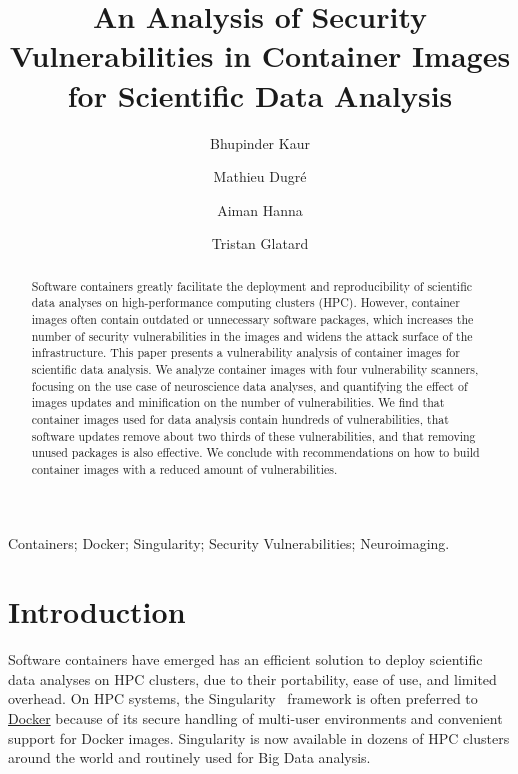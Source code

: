 \documentclass[a4paper,num-refs]{oup-contemporary}
\title{An Analysis of Security Vulnerabilities in Container Images for Scientific Data Analysis}
\begin{document}
\author{Bhupinder Kaur}
\author{Mathieu Dugr\'e}
\author{Aiman Hanna}
\author{Tristan Glatard}


\maketitle

\begin{abstract}
Software containers greatly facilitate the deployment and reproducibility
of scientific data analyses on high-performance computing clusters
(HPC). However, container images often contain outdated or unnecessary
software packages, which increases the number of security vulnerabilities
in the images and widens the attack surface of the infrastructure. This
paper presents a vulnerability analysis of container images for scientific
data analysis. We analyze container images with four vulnerability
scanners, focusing on the use case of neuroscience data analyses, and
quantifying the effect of images updates and minification on the number of
vulnerabilities. We find that container images used for data analysis
contain hundreds of vulnerabilities, that software updates remove about two
thirds of these vulnerabilities, and that removing unused packages is also
effective. We conclude with recommendations on how to build container
images with a reduced amount of vulnerabilities.

\end{abstract}

\begin{keywords}
Containers; Docker; Singularity; Security Vulnerabilities; Neuroimaging.
\end{keywords}

\section{Introduction}

Software containers have emerged has an efficient solution to deploy
scientific data analyses on HPC clusters, due
to their portability, ease of use, and limited overhead. On HPC systems, the
Singularity~\cite{kurtzer2017singularity} framework is often preferred to
\href{http://docker.com}{Docker} because of its
secure handling of multi-user environments and convenient support for
Docker images. Singularity is now available in dozens of HPC
clusters around the world and routinely used for Big Data analysis.
\end{document}
